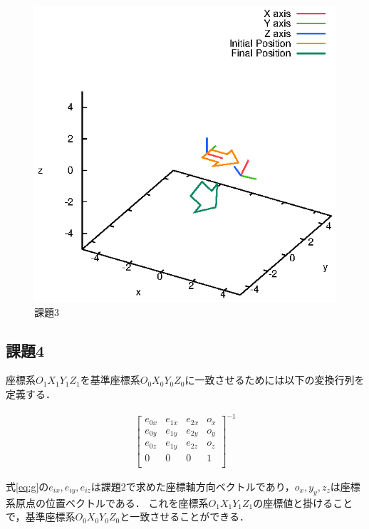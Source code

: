 \documentclass[a4paper,10pt]{jsarticle}
\begin{document}
\begin{figure}[b]
  \begin{center}
    \includegraphics[clip,width=14cm]{fig/eps/3.eps}
  \end{center}
  \caption{課題3}
  \label{fig:課題3}
\end{figure}

\subsection{課題4}
座標系$O_1X_1Y_1Z_1$を基準座標系$O_0X_0Y_0Z_0$に一致させるためには以下の変換行列を定義する．

\begin{eqnarray}
\label{eq:g}
  \left[
    \begin{array}{cccc}
      e_{0x} & e_{1x} & e_{2x} & o_x \\
      e_{0y} & e_{1y} & e_{2y} & o_y\\
      e_{0z} & e_{1y} & e_{2z}& o_z\\
      0 & 0 & 0 & 1\\
    \end{array}
  \right]^{-1}
\end{eqnarray}

式\eqref{eq:g}の$e_{ix}, e_{iy}, e_{iz}$は課題2で求めた座標軸方向ベクトルであり，$o_{x}, y_{y}, z_{z}$は座標系原点の位置ベクトルである．
これを座標系$O_1X_1Y_1Z_1$の座標値と掛けることで，基準座標系$O_0X_0Y_0Z_0$と一致させることができる．
\end{document}
